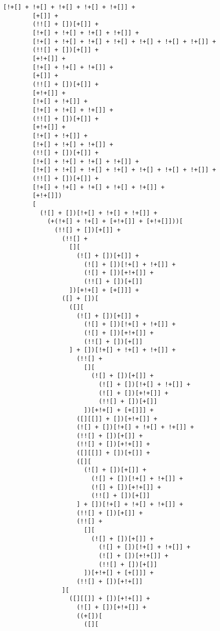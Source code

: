 \begin{lstlisting}[style=basicStyle, caption=alert('XSS') in JSFuck, label={lst:alertxssjsfuck}]
        [!+[] + !+[] + !+[] + !+[] + !+[]] +
        [+[]] +
        (!![] + [])[+[]] +
        [!+[] + !+[] + !+[] + !+[]] +
        [!+[] + !+[] + !+[] + !+[] + !+[] + !+[] + !+[]] +
        (!![] + [])[+[]] +
        [+!+[]] +
        [!+[] + !+[] + !+[]] +
        [+[]] +
        (!![] + [])[+[]] +
        [+!+[]] +
        [!+[] + !+[]] +
        [!+[] + !+[] + !+[]] +
        (!![] + [])[+[]] +
        [+!+[]] +
        [!+[] + !+[]] +
        [!+[] + !+[] + !+[]] +
        (!![] + [])[+[]] +
        [!+[] + !+[] + !+[] + !+[]] +
        [!+[] + !+[] + !+[] + !+[] + !+[] + !+[] + !+[]] +
        (!![] + [])[+[]] +
        [!+[] + !+[] + !+[] + !+[] + !+[]] +
        [+!+[]])
        [
          (![] + [])[!+[] + !+[] + !+[]] +
            (+(!+[] + !+[] + [+!+[]] + [+!+[]]))[
              (!![] + [])[+[]] +
                (!![] +
                  [][
                    (![] + [])[+[]] +
                      (![] + [])[!+[] + !+[]] +
                      (![] + [])[+!+[]] +
                      (!![] + [])[+[]]
                  ])[+!+[] + [+[]]] +
                ([] + [])[
                  ([][
                    (![] + [])[+[]] +
                      (![] + [])[!+[] + !+[]] +
                      (![] + [])[+!+[]] +
                      (!![] + [])[+[]]
                  ] + [])[!+[] + !+[] + !+[]] +
                    (!![] +
                      [][
                        (![] + [])[+[]] +
                          (![] + [])[!+[] + !+[]] +
                          (![] + [])[+!+[]] +
                          (!![] + [])[+[]]
                      ])[+!+[] + [+[]]] +
                    ([][[]] + [])[+!+[]] +
                    (![] + [])[!+[] + !+[] + !+[]] +
                    (!![] + [])[+[]] +
                    (!![] + [])[+!+[]] +
                    ([][[]] + [])[+[]] +
                    ([][
                      (![] + [])[+[]] +
                        (![] + [])[!+[] + !+[]] +
                        (![] + [])[+!+[]] +
                        (!![] + [])[+[]]
                    ] + [])[!+[] + !+[] + !+[]] +
                    (!![] + [])[+[]] +
                    (!![] +
                      [][
                        (![] + [])[+[]] +
                          (![] + [])[!+[] + !+[]] +
                          (![] + [])[+!+[]] +
                          (!![] + [])[+[]]
                      ])[+!+[] + [+[]]] +
                    (!![] + [])[+!+[]]
                ][
                  ([][[]] + [])[+!+[]] +
                    (![] + [])[+!+[]] +
                    ((+[])[
                      ([][

\end{lstlisting}
